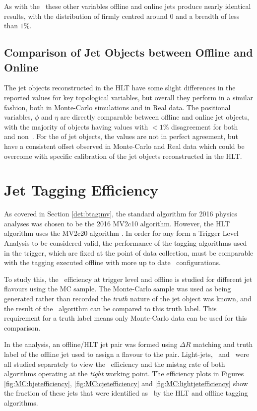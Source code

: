 	As with the \bjets\, these other variables offline and online jets produce nearly identical results, with the distribution of \dxx firmly centred around 0 and a breadth of less than $1\%$.

	\subsection{Comparison of Jet Objects between Offline and Online}

		The jet objects reconstructed in the HLT have some slight differences in the reported values for key topological variables, but overall they perform in a similar fashion, both in Monte-Carlo simulations and in Real data. The positional variables, $\phi$ and $\eta$ are directly comparable between offline and online jet objects, with the majority of objects having values with $<1\%$ disagreement for both \bjets\, and non \bjets\,. For the \pt of jet objects, the values are not in perfect agreement, but have a consistent offset observed in Monte-Carlo and Real data which could be overcome with specific calibration of the jet objects reconstructed in the HLT.

\section{Jet Tagging Efficiency}

	As covered in Section  \ref{det:btag:mv}, the standard algorithm for 2016 physics analyses was chosen to be the 2016 MV2c10 algorithm. However, the HLT \btag\, algorithm uses the MV2c20 algorithm \cite{trig2015}. In order for any form a Trigger Level Analysis to be considered valid, the performance of the tagging algorithms used in the trigger, which are fixed at the point of data collection, must be comparable with the tagging executed offline with more up to date \btag\, configurations.

	To study this, the \btag\, efficiency at trigger level and offline is studied for different jet flavours using the MC sample. The Monte-Carlo sample was used as being generated rather than recorded the \textit{truth} nature of the jet object was known, and the result of the \btag\, algorithm can be compared to this truth label. This requirement for a truth label means only Monte-Carlo data can be used for this comparison.

	In the analysis, an offline/HLT jet pair was formed using $\Delta R$ matching and truth label of the offline jet used to assign a flavour to the pair. Light-jets, \bjets\, and \cjets\, were all studied separately to view the \btag\, efficiency and the mistag rate of both algorithms operating at the \textit{tight} working point. The efficiency plots in Figures \ref{fig:MC:bjetefficiency}, \ref{fig:MC:cjetefficiency} and \ref{fig:MC:lightjetefficiency} show the fraction of these jets that were identified as \bjets\, by the HLT and offline tagging algorithms.

